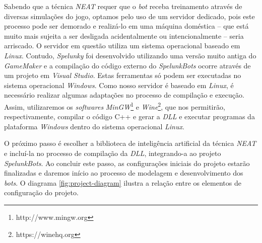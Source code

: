 Sabendo que a técnica \textit{NEAT} requer que o \textit{bot} receba treinamento
através de diversas simulações do jogo, optamos pelo uso de um servidor
dedicado, pois este processo pode ser demorado e realizá-lo em uma máquina
doméstica -- que está muito mais sujeita a ser desligada acidentalmente ou
intencionalmente -- seria arriscado. O servidor em questão utiliza um sistema
operacional baseado em \textit{Linux}.  Contudo, \textit{Spelunky} foi
desenvolvido utilizando uma versão muito antiga do \textit{GameMaker} e a
compilação do código externo do \textit{SpelunkBots} ocorre através de um
projeto em \textit{Visual Studio}.  Estas ferramentas só podem ser executadas no
sistema operacional \textit{Windows}. Como nosso servidor é baseado em
\textit{Linux}, é necessário realizar algumas adaptações no processo de
compilação e execução. Assim, utilizaremos os \textit{softwares}
\textit{MinGW}\footnote{http://www.mingw.org} e
\textit{Wine}\footnote{https://winehq.org}, que nos permitirão, respectivamente,
compilar o código C++ e gerar a \textit{DLL} e executar programas da plataforma
\textit{Windows} dentro do sistema operacional \textit{Linux}.

O próximo passo é escolher a biblioteca de inteligência artificial da técnica
\textit{NEAT} e incluí-la no processo de compilação da \textit{DLL},
integrando-a ao projeto \textit{SpelunkBots}. Ao concluir este passo, as
configurações iniciais do projeto estarão finalizadas e daremos início ao
processo de modelagem e desenvolvimento dos \textit{bots}. O diagrama
\ref{fig:project-diagram} ilustra a relação entre os elementos de configuração
do projeto.

